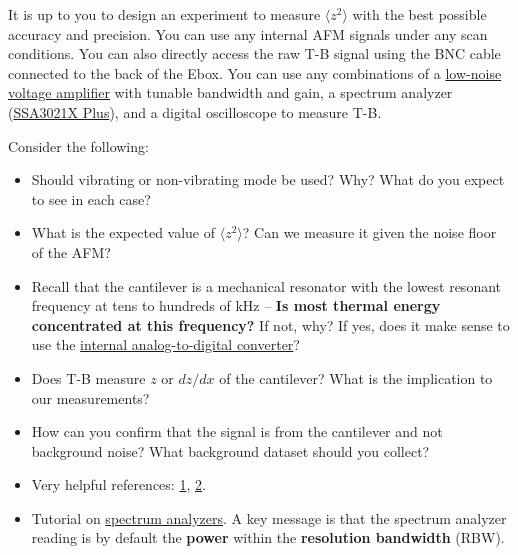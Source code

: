 \documentclass{../lab}
\begin{document}
It is up to you to design an experiment to measure $\langle z^2 \rangle$ with the best possible accuracy and precision. You can use any internal AFM signals under any scan conditions. You can also directly access the raw T-B signal using the BNC cable connected to the back of the Ebox. You can use any combinations of a \href{https://www.thinksrs.com/products/sr560.html}{low-noise voltage amplifier} with tunable bandwidth and gain, a spectrum analyzer (\href{https://siglentna.com/wp-content/uploads/2020/07/UserManual_UG0703P_E02A.pdf}{SSA3021X Plus}), and a digital oscilloscope to measure T-B. 


Consider the following: 

\begin{itemize}
    \item Should vibrating or non-vibrating mode be used? Why? What do you expect to see in each case?
    \item What is the expected value of $\langle z^2 \rangle$? Can we measure it given the noise floor of the AFM?
    \item Recall that the cantilever is a mechanical resonator with the lowest resonant frequency at tens to hundreds of kHz -- \textbf{Is most thermal energy concentrated at this frequency?} If not, why? If yes, does it make sense to use the \href{https://www.ni.com/en-us/support/model.usb-6009.html}{internal analog-to-digital converter}?
    \item Does T-B measure $z$ or $dz/dx$ of the cantilever? What is the implication to our measurements?
    \item How can you confirm that the signal is from the cantilever and not background noise? What background dataset should you collect?
    \item Very helpful references: \href{https://iopscience.iop.org/article/10.1088/0957-4484/6/1/001/meta}{1}, \href{https://aip.scitation.org/doi/abs/10.1063/1.1143970}{2}. 
    \item Tutorial on \href{https://www.youtube.com/watch?v=P5gxNGckjLc&&ab_channel=RohdeSchwarz}{spectrum analyzers}. A key message is that the spectrum analyzer reading is by default the \textbf{power} within the \textbf{resolution bandwidth} (RBW).
\end{itemize} 
\end{document}
